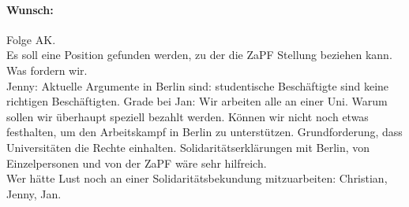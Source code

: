     \paragraph{Wunsch:}
      Folge AK. \\
      Es soll eine Position gefunden werden, zu der die ZaPF Stellung beziehen kann. Was fordern wir. \\

      Jenny: Aktuelle Argumente in Berlin sind: studentische Beschäftigte sind keine richtigen Beschäftigten. Grade bei Jan: Wir arbeiten alle an einer Uni. Warum sollen wir überhaupt speziell bezahlt werden. Können wir nicht noch etwas festhalten, um den Arbeitskampf in Berlin zu unterstützen. Grundforderung, dass Universitäten die Rechte einhalten. Solidaritätserklärungen mit Berlin, von Einzelpersonen und von der ZaPF wäre sehr hilfreich. \\
      Wer hätte Lust noch an einer Solidaritätsbekundung mitzuarbeiten: Christian, Jenny, Jan.
